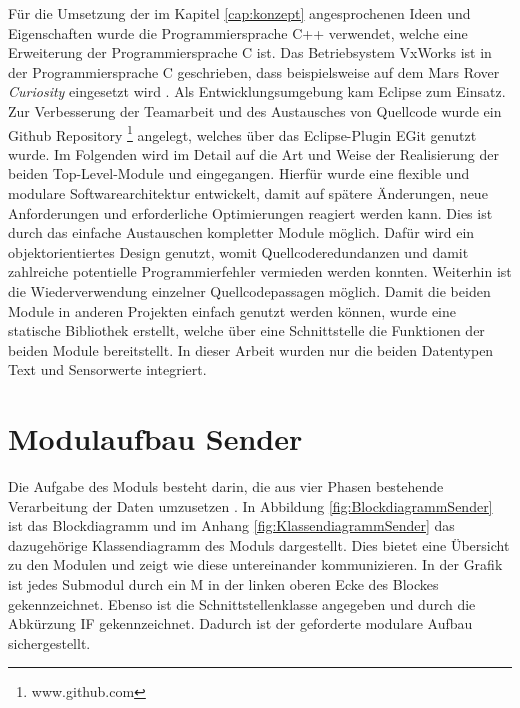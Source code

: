 \label{cap:implementierung}
F{\"u}r die Umsetzung der im Kapitel \ref{cap:konzept} angesprochenen Ideen und
Eigenschaften wurde die Programmiersprache C++ verwendet, welche eine
Erweiterung der Programmiersprache C ist. Das Betriebsystem VxWorks ist in der
Programmiersprache C geschrieben, dass beispielsweise auf dem Mars Rover
\textit{Curiosity} eingesetzt wird \cite{WR}.
Als Entwicklungsumgebung kam Eclipse zum Einsatz.
Zur Verbesserung der Teamarbeit und des Austausches von Quellcode wurde ein
Github Repository \footnote{www.github.com} angelegt, welches {\"u}ber das
Eclipse-Plugin EGit genutzt wurde. \newline
Im Folgenden wird im Detail auf die Art und Weise der Realisierung der beiden
Top-Level-Module  und  eingegangen. Hierf{\"u}r
wurde eine flexible und modulare Softwarearchitektur entwickelt, damit auf
sp{\"a}tere {\"A}nderungen, neue Anforderungen und erforderliche Optimierungen
reagiert werden kann. Dies ist durch das einfache Austauschen kompletter Module
m{\"o}glich.
Daf{\"u}r wird ein objektorientiertes Design genutzt, womit Quellcoderedundanzen und damit
zahlreiche potentielle Programmierfehler vermieden werden konnten.
Weiterhin ist die Wiederverwendung einzelner Quellcodepassagen m{\"o}glich.\newline
Damit die beiden Module in anderen Projekten einfach genutzt werden k{\"o}nnen,
wurde eine statische Bibliothek erstellt, welche {\"u}ber eine Schnittstelle die
Funktionen der beiden Module bereitstellt. In dieser Arbeit wurden nur die beiden
Datentypen Text und Sensorwerte integriert.

\section{Modulaufbau Sender}
 
Die Aufgabe des Moduls  besteht darin, die aus vier Phasen
bestehende Verarbeitung der Daten umzusetzen \cite{Daher}.
In Abbildung \ref{fig:BlockdiagrammSender} ist das Blockdiagramm und im Anhang
\ref{fig:KlassendiagrammSender} das dazugehörige Klassendiagramm des Moduls
 dargestellt.
Dies bietet eine {\"U}bersicht zu den Modulen und zeigt wie diese untereinander 
kommunizieren. In der Grafik ist jedes Submodul durch ein M in der linken
oberen Ecke des Blockes gekennzeichnet. Ebenso ist die Schnittstellenklasse
angegeben und durch die Abk{\"u}rzung \gls{IF} gekennzeichnet. Dadurch ist der
geforderte modulare Aufbau sichergestellt.

